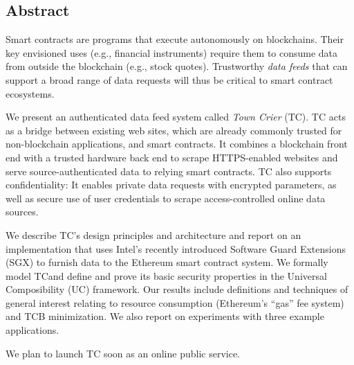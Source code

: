 \subsection*{Abstract}
Smart contracts are programs that execute autonomously on blockchains. Their key envisioned uses (e.g., financial instruments) require them to consume data from outside the blockchain (e.g., stock quotes). Trustworthy {\em data feeds} that can support a broad range of data requests will thus be critical to smart contract ecosystems. 

	We present an authenticated data feed system called {\em Town Crier} (TC). TC acts as a bridge between existing web sites, which are already commonly trusted for non-blockchain applications, and smart contracts. It combines a blockchain front end with a trusted hardware back end to scrape HTTPS-enabled websites and serve source-authenticated data to relying smart contracts. TC also supports confidentiality: It enables private data requests with encrypted parameters, as well as secure use of user credentials to scrape access-controlled online data sources.
	
	We describe TC's design principles and architecture and report on an implementation that uses Intel's recently introduced Software Guard Extensions (SGX) to furnish data to the Ethereum smart contract system. We formally model TCand  define and prove its basic security properties in the Universal Composibility (UC) framework. Our results include definitions and techniques of general interest relating to resource consumption (Ethereum's ``gas'' fee system) and TCB minimization. We also report on experiments with three example applications. 
	
	We plan to launch TC soon as an online public service.

